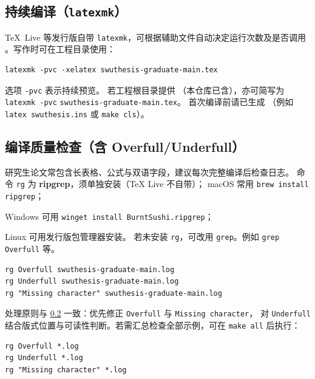 \subsection{持续编译（\texttt{latexmk}）}
TeX~Live 等发行版自带 \texttt{latexmk}，可根据辅助文件自动决定运行次数及是否调用 。写作时可在工程目录使用：
\begin{verbatim}
latexmk -pvc -xelatex swuthesis-graduate-main.tex
\end{verbatim}
选项 \texttt{-pvc} 表示持续预览。%
若工程根目录提供 （本仓库已含），亦可简写为%
\texttt{latexmk -pvc} \texttt{swuthesis-graduate-main.tex}。%
首次编译前请已生成 %
（例如 \texttt{latex swuthesis.ins} 或 \texttt{make cls}）。%

\subsection{编译质量检查（含 Overfull/Underfull）}\label{sec:doctor-compile-quality-check}
研究生论文常包含长表格、公式与双语字段，建议每次完整编译后检查日志。
命令 \texttt{rg} 为 \textbf{ripgrep}，须单独安装（\TeX{} Live 不自带）；%
macOS 常用 \texttt{brew install ripgrep}；\par
\noindent
Windows 可用 \texttt{winget install BurntSushi.ripgrep}；\par
\noindent
Linux 可用发行版包管理器安装。%
若未安装 \texttt{rg}，可改用 \texttt{grep}。例如%
\texttt{grep} \texttt{Overfull}  等。
\begin{verbatim}
rg Overfull swuthesis-graduate-main.log
rg Underfull swuthesis-graduate-main.log
rg "Missing character" swuthesis-graduate-main.log
\end{verbatim}
处理原则与 \cref{sec:doctor-compile-quality-check} 一致：优先修正 \texttt{Overfull} 与%
\texttt{Missing character}，%
对 \texttt{Underfull} 结合版式位置与可读性判断。若需汇总检查全部示例，可在 \texttt{make all} 后执行：
\begin{verbatim}
rg Overfull *.log
rg Underfull *.log
rg "Missing character" *.log
\end{verbatim}

